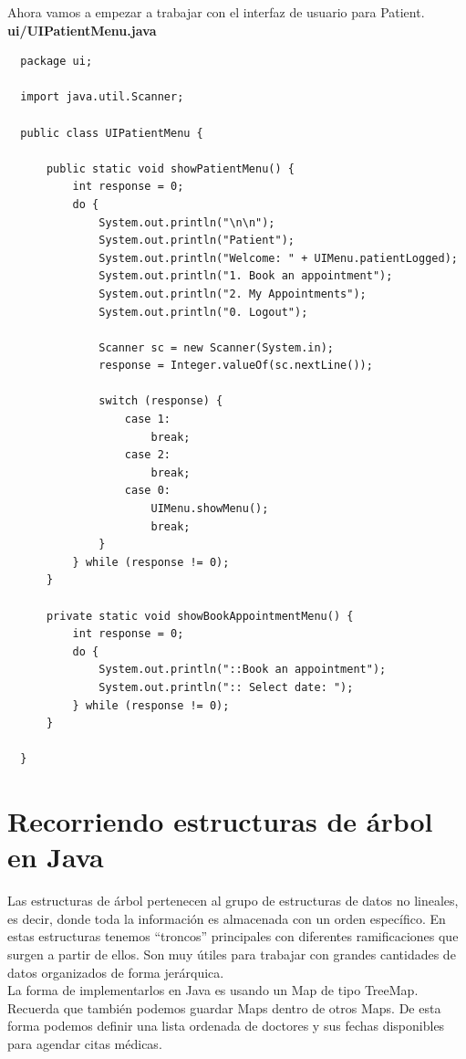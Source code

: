 \documentclass{article}
\begin{document}
Ahora vamos a empezar a trabajar con el interfaz de usuario para Patient.\\

\textbf{ui/UIPatientMenu.java}
\begin{verbatim}
  package ui;

  import java.util.Scanner;

  public class UIPatientMenu {

      public static void showPatientMenu() {
          int response = 0;
          do {
              System.out.println("\n\n");
              System.out.println("Patient");
              System.out.println("Welcome: " + UIMenu.patientLogged);
              System.out.println("1. Book an appointment");
              System.out.println("2. My Appointments");
              System.out.println("0. Logout");

              Scanner sc = new Scanner(System.in);
              response = Integer.valueOf(sc.nextLine());

              switch (response) {
                  case 1:
                      break;
                  case 2:
                      break;
                  case 0:
                      UIMenu.showMenu();
                      break;
              }
          } while (response != 0);
      }

      private static void showBookAppointmentMenu() {
          int response = 0;
          do {
              System.out.println("::Book an appointment");
              System.out.println(":: Select date: ");
          } while (response != 0);
      }

  }
\end{verbatim}


\section{Recorriendo estructuras de árbol en Java}%
Las estructuras de árbol pertenecen al grupo de estructuras de datos no
lineales, es decir, donde toda la información es almacenada con un orden
específico. En estas estructuras tenemos “troncos” principales con diferentes
ramificaciones que surgen a partir de ellos. Son muy útiles para trabajar con
grandes cantidades de datos organizados de forma jerárquica.\\

La forma de implementarlos en Java es usando un Map de tipo TreeMap. Recuerda
que también podemos guardar Maps dentro de otros Maps. De esta forma podemos
definir una lista ordenada de doctores y sus fechas disponibles para agendar
citas médicas.\\
\end{document}
